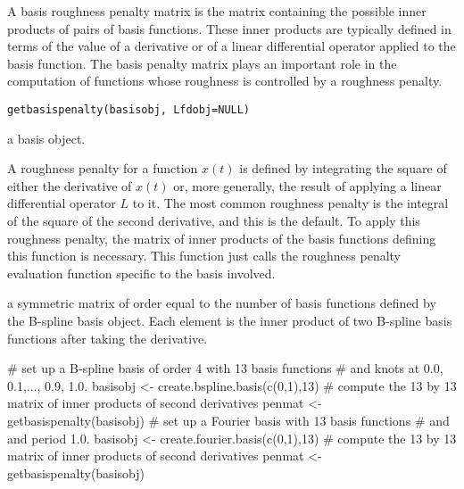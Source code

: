 \begin{Description}\relax
A basis roughness penalty matrix is the matrix containing
the possible inner products of pairs of basis functions.
These inner products are typically defined in terms of
the value of a derivative or of a linear differential
operator applied to the basis function.  The basis penalty
matrix plays an important role in the computation of
functions whose roughness is controlled by a roughness
penalty.
\end{Description}
\begin{Usage}
\begin{verbatim}
getbasispenalty(basisobj, Lfdobj=NULL)
\end{verbatim}
\end{Usage}
\begin{Arguments}
\begin{ldescription}
\item[\code{basisobj}] a basis object.

\item[\code{Lfdobj}] 
\end{ldescription}
\end{Arguments}
\begin{Details}\relax
A roughness penalty for a function $x(t)$ is defined by
integrating the square of either the derivative of  $ x(t) $ or,
more generally, the result of applying a linear differential operator
$L$ to it.  The most common roughness penalty is the integral of
the square of the second derivative, and
this is the default. To apply this roughness penalty, the matrix of
inner products of the basis functions defining this function is
necessary. This function just calls the roughness penalty evaluation
function specific to the basis involved.
\end{Details}
\begin{Value}
a symmetric matrix of order equal to the number of basis functions
defined by the B-spline basis object.  Each element is the inner product
of two B-spline basis functions after taking the derivative.
\end{Value}
\begin{SeeAlso}\relax
{}
\end{SeeAlso}
\begin{Examples}
\begin{ExampleCode}

#  set up a B-spline basis of order 4 with 13 basis functions
#  and knots at 0.0, 0.1,..., 0.9, 1.0.
basisobj <- create.bspline.basis(c(0,1),13)
#  compute the 13 by 13 matrix of inner products of second derivatives
penmat <- getbasispenalty(basisobj)
#  set up a Fourier basis with 13 basis functions
#  and and period 1.0.
basisobj <- create.fourier.basis(c(0,1),13)
#  compute the 13 by 13 matrix of inner products of second derivatives
penmat <- getbasispenalty(basisobj)

\end{ExampleCode}
\end{Examples}

